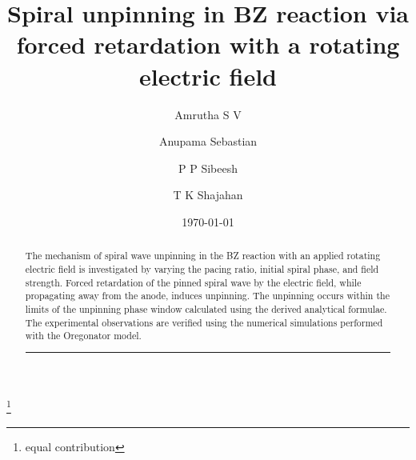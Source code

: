 \documentclass[%
 preprint,
 amsmath,amssymb,
 aps,
]{revtex4-2}
\begin{document}

\title{Spiral unpinning in BZ reaction via forced retardation with a rotating electric field }%


\author{Amrutha S V}
\thanks{equal contribution}%
\author{Anupama Sebastian}%

\author{P P Sibeesh}

\author{T K Shajahan}


\date{\today}%

\begin{abstract}
The mechanism of spiral wave unpinning in the BZ reaction with an applied rotating electric field is investigated by varying the pacing ratio, initial spiral phase, and field strength. Forced retardation of the pinned spiral wave by the electric field, while propagating away from the anode, induces unpinning. The unpinning occurs within the limits of the unpinning phase window calculated using the derived analytical formulae. The experimental observations are verified using the numerical simulations performed with the Oregonator model.
\vspace{5pt}
\hrule
\vspace{5pt} 
\end{abstract}

                             
\maketitle


\end{document}
